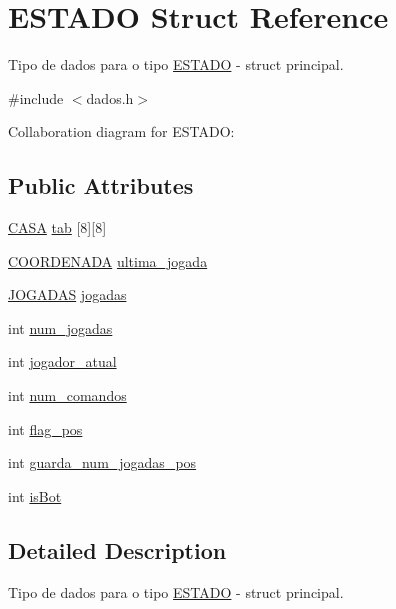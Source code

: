 \hypertarget{structESTADO}{}\section{E\+S\+T\+A\+DO Struct Reference}
\label{structESTADO}


Tipo de dados para o tipo \hyperlink{structESTADO}{E\+S\+T\+A\+DO} -\/ struct principal.  




{\ttfamily \#include $<$dados.\+h$>$}



Collaboration diagram for E\+S\+T\+A\+DO\+:
\subsection*{Public Attributes}
\begin{DoxyCompactItemize}
\item 
\hyperlink{dados_8h_aba91601f16d4c485b2d9b8c429f27039}{C\+A\+SA} \hyperlink{structESTADO_ab56f0f1be16954d3768b4174d14c087d}{tab} \mbox{[}8\mbox{]}\mbox{[}8\mbox{]}
\item 
\hyperlink{structCOORDENADA}{C\+O\+O\+R\+D\+E\+N\+A\+DA} \hyperlink{structESTADO_a4896a5c5c1f40b43fb795623327e3f47}{ultima\+\_\+jogada}
\item 
\hyperlink{dados_8h_a94c221d29a1760f008b7834093259b7d}{J\+O\+G\+A\+D\+AS} \hyperlink{structESTADO_afae43b87a488fad0f2b56a18bad31d18}{jogadas}
\item 
int \hyperlink{structESTADO_a261495728744647e618b4e623f5a4b7a}{num\+\_\+jogadas}
\item 
int \hyperlink{structESTADO_a5dd28e2e68b7aef2b6b7ea88e02eff58}{jogador\+\_\+atual}
\item 
int \hyperlink{structESTADO_abe6faacdd6111160bf9a354f44b95b38}{num\+\_\+comandos}
\item 
int \hyperlink{structESTADO_adde8d015fd9e3226ed7dbf0132af564c}{flag\+\_\+pos}
\item 
int \hyperlink{structESTADO_ad5bfac1569295b5ec32cf578c3001197}{guarda\+\_\+num\+\_\+jogadas\+\_\+pos}
\item 
int \hyperlink{structESTADO_aed0811b2232af2fb6d00942c1aea3731}{is\+Bot}
\end{DoxyCompactItemize}


\subsection{Detailed Description}
Tipo de dados para o tipo \hyperlink{structESTADO}{E\+S\+T\+A\+DO} -\/ struct principal. 

